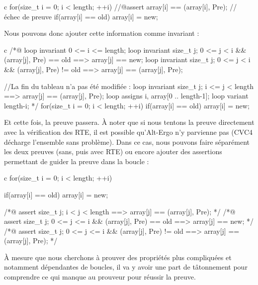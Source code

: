 \begin{CodeBlock}{c}
for(size_t i = 0; i < length; ++i){
    //@assert array[i] == \at(array[i], Pre); // échec de preuve
    if(array[i] == old) array[i] = new;
}
\end{CodeBlock}



Nous pouvons donc ajouter cette information comme invariant :



\begin{CodeBlock}{c}
/*@
  loop invariant 0 <= i <= length;
  loop invariant \forall size_t j; 0 <= j < i && \at(array[j], Pre) == old 
                   ==> array[j] == new;
  loop invariant \forall size_t j; 0 <= j < i && \at(array[j], Pre) != old 
                   ==> array[j] == \at(array[j], Pre);

  //La fin du tableau n'a pas été modifiée :
  loop invariant \forall size_t j; i <= j < length
                     ==> array[j] == \at(array[j], Pre);
  loop assigns i, array[0 .. length-1];
  loop variant length-i;
*/
for(size_t i = 0; i < length; ++i){
  if(array[i] == old) array[i] = new;
}
\end{CodeBlock}



Et cette fois, la preuve passera. À noter que si nous tentons la preuve 
directement avec la vérification des RTE, il est possible qu'Alt-Ergo n'y
parvienne pas (CVC4 décharge l'ensemble sans problème). Dans ce cas, nous
pouvons faire séparément les deux preuves (sans, puis avec RTE) ou encore 
ajouter des assertions permettant de guider la preuve dans la boucle :



\begin{CodeBlock}{c}
for(size_t i = 0; i < length; ++i){
  if(array[i] == old) array[i] = new;

  /*@ assert \forall size_t j; i < j < length 
               ==> array[j] == \at(array[j], Pre);                      */
  /*@ assert \forall size_t j; 0 <= j <= i && \at(array[j], Pre) == old 
               ==> array[j] == new;                                     */
  /*@ assert \forall size_t j; 0 <= j <= i && \at(array[j], Pre) != old 
               ==> array[j] == \at(array[j], Pre);                      */    
}
\end{CodeBlock}



À mesure que nous cherchons à prouver des propriétés plus compliquées et 
notamment dépendantes de boucles, il va y avoir une part de tâtonnement pour
comprendre ce qui manque au prouveur pour réussir la preuve.



